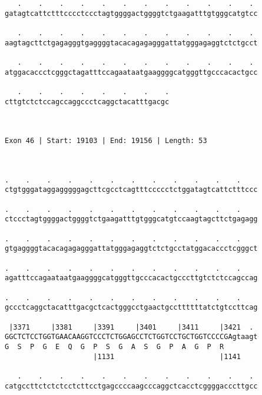 \documentclass{article}
\begin{document}
\begin{Verbatim}
   .    .    .    .    .    .    .    .    .    .    .    . 
gatagtcattctttcccctccctagtggggactggggtctgaagatttgtgggcatgtcc
                                                            
   .    .    .    .    .    .    .    .    .    .    .    . 
aagtagcttctgagagggtgaggggtacacagagagggattatgggagaggtctctgcct
                                                            
   .    .    .    .    .    .    .    .    .    .    .    . 
atggacaccctcgggctagatttccagaataatgaaggggcatgggttgcccacactgcc
                                                            
   .    .    .    .    .    .    .    .
cttgtctctccagccaggccctcaggctacatttgacgc
                                       
                                       
 
Exon 46 | Start: 19103 | End: 19156 | Length: 53



.    .    .    .    .    .    .    .    .    .    .    .    
ctgtgggataggagggggagcttcgcctcagtttccccctctggatagtcattctttccc
                                                            
.    .    .    .    .    .    .    .    .    .    .    .    
ctccctagtggggactggggtctgaagatttgtgggcatgtccaagtagcttctgagagg
                                                            
.    .    .    .    .    .    .    .    .    .    .    .    
gtgaggggtacacagagagggattatgggagaggtctctgcctatggacaccctcgggct
                                                            
.    .    .    .    .    .    .    .    .    .    .    .    
agatttccagaataatgaaggggcatgggttgcccacactgcccttgtctctccagccag
                                                            
.    .    .    .    .    .    .    .    .    .    .    .    
gccctcaggctacatttgacgctcactgggcctgaactgccttttttatctgtccttcag
                                                            
 |3371     |3381     |3391     |3401     |3411     |3421  . 
GGCTCTCCTGGTGAACAAGGTCCCTCTGGAGCCTCTGGTCCTGCTGGTCCCCGAgtaagt
G  S  P  G  E  Q  G  P  S  G  A  S  G  P  A  G  P  R        
                     |1131                         |1141    
  
   .    .    .    .    .    .    .    .    .    .    .    . 
catgccttctctctcctcttcctgagccccaagcccaggctcacctcggggacccttgcc
                                                            

\end{Verbatim}
\end{document}
